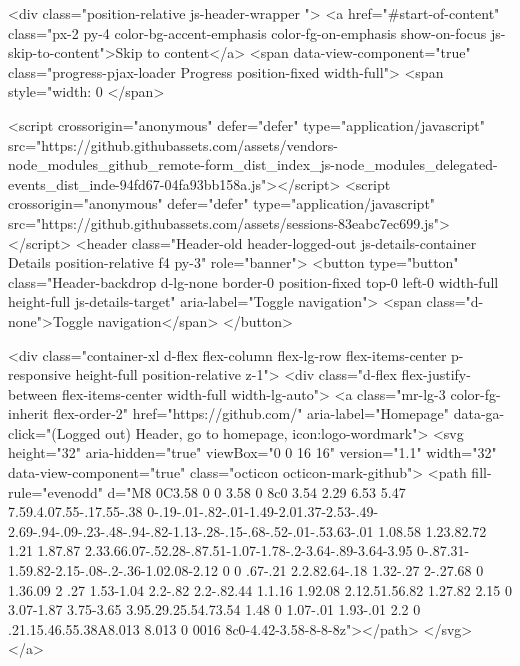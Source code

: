     <div class="position-relative js-header-wrapper ">
      <a href="#start-of-content" class="px-2 py-4 color-bg-accent-emphasis color-fg-on-emphasis show-on-focus js-skip-to-content">Skip to content</a>
      <span data-view-component="true" class="progress-pjax-loader Progress position-fixed width-full">
    <span style="width: 0%
</span>      
      


        

            <script crossorigin="anonymous" defer="defer" type="application/javascript" src="https://github.githubassets.com/assets/vendors-node_modules_github_remote-form_dist_index_js-node_modules_delegated-events_dist_inde-94fd67-04fa93bb158a.js"></script>
<script crossorigin="anonymous" defer="defer" type="application/javascript" src="https://github.githubassets.com/assets/sessions-83eabc7ec699.js"></script>
<header class="Header-old header-logged-out js-details-container Details position-relative f4 py-3" role="banner">
  <button type="button" class="Header-backdrop d-lg-none border-0 position-fixed top-0 left-0 width-full height-full js-details-target" aria-label="Toggle navigation">
    <span class="d-none">Toggle navigation</span>
  </button>

  <div class="container-xl d-flex flex-column flex-lg-row flex-items-center p-responsive height-full position-relative z-1">
    <div class="d-flex flex-justify-between flex-items-center width-full width-lg-auto">
      <a class="mr-lg-3 color-fg-inherit flex-order-2" href="https://github.com/" aria-label="Homepage" data-ga-click="(Logged out) Header, go to homepage, icon:logo-wordmark">
        <svg height="32" aria-hidden="true" viewBox="0 0 16 16" version="1.1" width="32" data-view-component="true" class="octicon octicon-mark-github">
    <path fill-rule="evenodd" d="M8 0C3.58 0 0 3.58 0 8c0 3.54 2.29 6.53 5.47 7.59.4.07.55-.17.55-.38 0-.19-.01-.82-.01-1.49-2.01.37-2.53-.49-2.69-.94-.09-.23-.48-.94-.82-1.13-.28-.15-.68-.52-.01-.53.63-.01 1.08.58 1.23.82.72 1.21 1.87.87 2.33.66.07-.52.28-.87.51-1.07-1.78-.2-3.64-.89-3.64-3.95 0-.87.31-1.59.82-2.15-.08-.2-.36-1.02.08-2.12 0 0 .67-.21 2.2.82.64-.18 1.32-.27 2-.27.68 0 1.36.09 2 .27 1.53-1.04 2.2-.82 2.2-.82.44 1.1.16 1.92.08 2.12.51.56.82 1.27.82 2.15 0 3.07-1.87 3.75-3.65 3.95.29.25.54.73.54 1.48 0 1.07-.01 1.93-.01 2.2 0 .21.15.46.55.38A8.013 8.013 0 0016 8c0-4.42-3.58-8-8-8z"></path>
</svg>
      </a>

